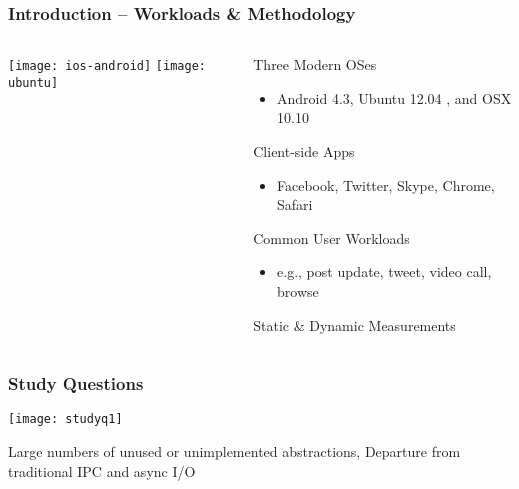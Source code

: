 \begin{frame}[plain]
	\frametitle{Introduction -- Workloads \& Methodology}
	
	
	\begin{columns}
		
		\begin{column}{.3\textwidth}	
			
			\centering
			\texttt{[image: ios-android]}
			\texttt{[image: ubuntu]}
			
		\end{column}
		
		
		
		\begin{column}{.7\textwidth}	
			\large
			Three Modern OSes
			
			\begin{itemize}\normalsize
				\item  Android 4.3, Ubuntu 12.04 , and OSX 10.10
			\end{itemize}
			
			\large
			Client-side Apps
			\begin{itemize}\normalsize
				\item   Facebook, Twitter, Skype, Chrome, Safari
				
			\end{itemize}			
			
			\large
			Common User Workloads
			
			\begin{itemize}\normalsize
				\item   e.g., post update, tweet, video call, browse
	
			\end{itemize}				

             Static \& Dynamic   Measurements
             
			
		\end{column}
		
		
	\end{columns}
	
	
\end{frame}


\begin{frame}[plain]	
	\frametitle{Study Questions}
	\centering
	\texttt{[image: studyq1]}
	
	Large numbers of unused or unimplemented abstractions,
	Departure from traditional IPC and async I/O
	
	
\end{frame}


